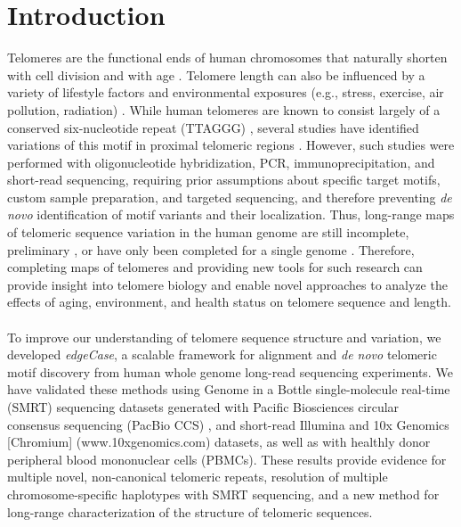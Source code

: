\documentclass{article}
\begin{document}
\section*{Introduction} 
    Telomeres are the functional ends of human chromosomes that naturally shorten with cell division and with age \parencite{teloaging}.
    Telomere length can also be influenced by a variety of lifestyle factors and environmental exposures
        (e.g., stress, exercise, air pollution, radiation) \parencite{teloeffects}.
    While human telomeres are known to consist largely of a conserved six-nucleotide repeat (TTAGGG) \parencite{moyzis},
        several studies have identified variations of this motif in proximal telomeric regions
            \parencite{telovars1989,telovars1999,telovars2018,telovars2019}.
    However, such studies were performed with oligonucleotide hybridization, PCR, immunoprecipitation, and short-read sequencing,
        requiring prior assumptions about specific target motifs, custom sample preparation, and targeted sequencing,
        and therefore preventing \textit{de novo} identification of motif variants and their localization.
    Thus, long-range maps of telomeric sequence variation in the human genome are still incomplete, preliminary \parencite{shafin},
        or have only been completed for a single genome \parencite{jain,t2t}.
    Therefore, completing maps of telomeres and providing new tools for such research \parencite{nurk} can provide insight into
        telomere biology and enable novel approaches to analyze the effects of aging, environment, and health status \parencite{telovars2018}
        on telomere sequence and length.
    \\~\\
    To improve our understanding of telomere sequence structure and variation, we developed \textit{edgeCase},
        a scalable framework for alignment and \textit{de novo} telomeric motif discovery
        from human whole genome long-read sequencing experiments.
    We have validated these methods using
        Genome in a Bottle \parencite{giab} single-molecule real-time (SMRT) sequencing datasets
            generated with Pacific Biosciences circular consensus sequencing (PacBio CCS) \parencite{pacbio,pacbioccs},
        and short-read Illumina \parencite{illumina} and 10x Genomics [Chromium] (www.10xgenomics.com) datasets,
        as well as with healthly donor peripheral blood mononuclear cells (PBMCs).
    These results provide evidence for
        multiple novel, non-canonical telomeric repeats,
        resolution of multiple chromosome-specific haplotypes with SMRT sequencing,
        and a new method for long-range characterization of the structure of telomeric sequences.
\end{document}

